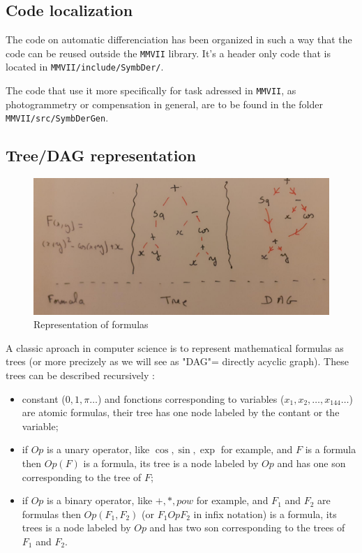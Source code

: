 \subsection{Code localization}

The code on automatic differenciation has been organized in such a way that 
the code can be reused outside the {\tt MMVII} library. It's a header only code
that is located in {\tt MMVII/include/SymbDer/}.


The code that use it more specifically for task adressed in  {\tt MMVII},
as photogrammetry or compensation in general, are to be found in the
folder  {\tt MMVII/src/SymbDerGen}.


\subsection{Tree/DAG representation}

\begin{figure}
\centering
\includegraphics[width=12cm]{Programmer/ImagesProg/Tree.jpg}
\caption{Representation of formulas}
\label{fig:TreeFormula}
\end{figure}

A classic aproach in computer science is to represent mathematical formulas 
as trees (or more precizely as we will see as "DAG"=  directly acyclic graph).
These trees can be described recursively :

\begin{itemize}
   \item  constant ($0,1,\pi \dots$)  and fonctions corresponding to variables ($x_1,x_2,\dots ,x_{144} \dots$)
          are  atomic formulas, their tree has one node labeled by the contant or the variable;

   \item if $Op$ is a unary operator, like $\cos, \sin, \exp $ for example,  and $F$ is a formula then $Op(F)$ is a 
         formula, its tree is a node labeled by $Op$ and has one son corresponding to the tree of $F$;

   \item if $Op$ is a binary operator, like $+,*,pow $ for example,  and $F_1$  and $F_2$ are 
	   formulas then $Op(F_1,F_2)$ (or $F_1 Op F_2$ in infix notation) is a 
         formula,  its trees is a node labeled by $Op$ and has two son corresponding to the trees of $F_1$ and $F_2$.
\end{itemize}


